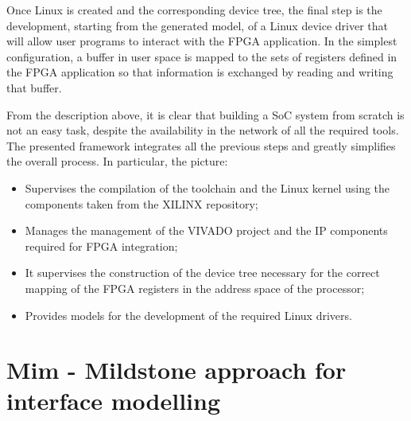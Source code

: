 Once Linux is created and the corresponding device tree, the final step is the development, starting from the generated model, of a Linux device driver that will allow user programs to interact with the FPGA application. In the simplest configuration, a buffer in user space is mapped to the sets of registers defined in the FPGA application so that information is exchanged by reading and writing that buffer.

From the description above, it is clear that building a SoC system from scratch is not an easy task, despite the availability in the network of all the required tools. The presented framework integrates all the previous steps and greatly simplifies the overall process. In particular, the picture:
\begin{itemize}
    \item Supervises the compilation of the toolchain and the Linux kernel using the components taken from the XILINX repository;
    \item Manages the management of the VIVADO project and the IP components required for FPGA integration;
    \item It supervises the construction of the device tree necessary for the correct mapping of the FPGA registers in the address space of the processor;
    \item Provides models for the development of the required Linux drivers.
\end{itemize}







\section{Mim - Mildstone approach for interface modelling}

